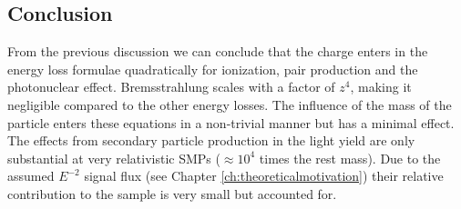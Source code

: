 \subsection{Conclusion}
\label{sub:energylossconclusion}
From the previous discussion we can conclude that the charge enters in the energy loss formulae quadratically for ionization, pair production and the photonuclear effect. Bremsstrahlung scales with a factor of $z^4$, making it negligible compared to the other energy losses. The influence of the mass of the particle enters these equations in a non-trivial manner but has a minimal effect. The effects from secondary particle production in the light yield are only substantial at very relativistic SMPs ($\approx 10^4$ times the rest mass). Due to the assumed $E^{-2}$ signal flux (see Chapter \ref{ch:theoreticalmotivation}) their relative contribution to the sample is very small but accounted for.
